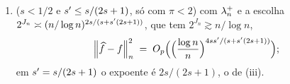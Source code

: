 \documentclass[11pt,a4paper]{article}
\begin{document}
\begin{proposition}
\begin{enumerate}[label=\textup{(\roman*)}, leftmargin=*]
\begin{equation}
      \label{eq:janela-truncada}
      \frac{s}{(2s+1)\seff} \;\le\; c \;<\; 1,
    \end{equation}
    que é a do Corolário~\ref{cor:compressivel}(iii),
    \[
      \normn{\widehat f - f}^{2} \;=\; O_{p}\Bigl(\Bigl(\frac{\log n}{n}\Bigr)^{2s/(2s+1)}\Bigr);
    \]
  \item \textup{($s < 1/2$ e $s' \le s/(2s+1)$, só com $\pi < 2$)} com
    $\lambda_{n}^{+}$ e a escolha $2^{J_{n}} \asymp
    (n/\log n)^{2s/(s+s'(2s+1))}$, que tem $2^{J_{n}} \gtrsim n/\log n$,
    \[
      \left\lVert \widehat f - f \right\rVert_{n}^{2} \;=\; O_{p}\Bigl(\Bigl(\frac{\log n}{n}\Bigr)^{4ss'/(s+s'(2s+1))}\Bigr);
    \]
    em $s' = s/(2s+1)$ o expoente é $2s/(2s+1)$, o de (iii).
\end{enumerate}
\end{proposition}
\end{document}
